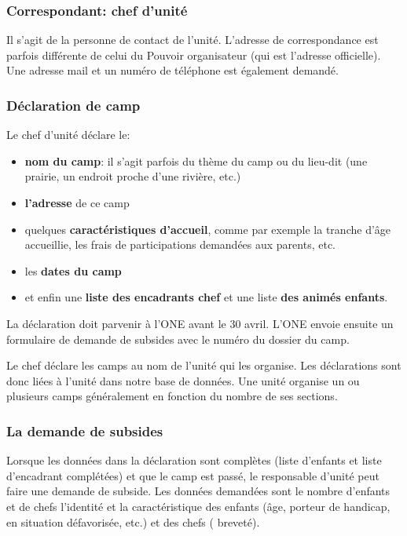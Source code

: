 \subsubsection{Correspondant: chef d'unité}
Il s'agit de la personne de contact de l'unité. L'adresse de correspondance est parfois différente de celui du Pouvoir organisateur (qui est l'adresse officielle). Une adresse mail et un numéro de téléphone est également demandé. 

\subsubsection{Déclaration de camp}
Le chef d'unité déclare le:
\begin{itemize}
    \item \textbf{nom du camp}: il s'agit parfois du thème du camp ou du lieu-dit (une prairie, un endroit proche d'une rivière, etc.)
    \item \textbf{l'adresse} de ce camp
    \item quelques \textbf{caractéristiques d'accueil}, comme par exemple la tranche d'âge accueillie, les frais de participations demandées aux parents, etc.
    \item les \textbf{dates du camp}
    \item et enfin une \textbf{liste des encadrants chef} et une liste \textbf{des animés enfants}.
\end{itemize}

La déclaration doit parvenir à l'ONE avant le 30 avril. L'ONE envoie ensuite un formulaire de demande de subsides avec le numéro du dossier du camp.

Le chef déclare les camps au nom de l'unité qui les organise. Les déclarations sont donc liées à l'unité dans notre base de données. Une unité organise un ou plusieurs camps généralement en fonction du nombre de ses sections. 




\subsubsection{La demande de subsides}
Lorsque les données dans la déclaration sont complètes (liste d'enfants et liste d'encadrant complétées) et que le camp est passé, le responsable d'unité peut faire une demande de subside. 
Les données demandées sont le nombre d'enfants et de chefs l'identité et la caractéristique des enfants (âge, porteur de handicap, en situation défavorisée, etc.) et des chefs ( breveté). 


